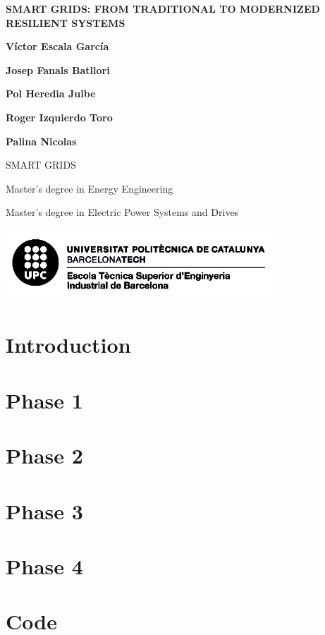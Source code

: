\documentclass[10pt, a4paper]{report}
\begin{document}
\begin{titlepage}
   \begin{center}
      \vspace*{2em}
      {\Large \bfseries SMART GRIDS: FROM TRADITIONAL TO MODERNIZED RESILIENT SYSTEMS}

       \vspace{6em}

       \textbf{Víctor Escala García}

       \textbf{Josep Fanals Batllori}

       \textbf{Pol Heredia Julbe}

       \textbf{Roger Izquierdo Toro}

       \textbf{Palina Nicolas}

       \vfill

       \vspace{1em}

       SMART GRIDS

       Master's degree in Energy Engineering

       Master's degree in Electric Power Systems and Drives

       \vspace{8em}
     
       \includegraphics[width=10cm]{Data/Logo.png}
            
   \end{center}
\end{titlepage}



\tableofcontents{}


\chapter{Introduction}
% 

\chapter{Phase 1}


\chapter{Phase 2}
% 

\chapter{Phase 3}
% 

\chapter{Phase 4}



\chapter{Code}
% 

\printbibliography[heading=bibintoc]
\end{document}
